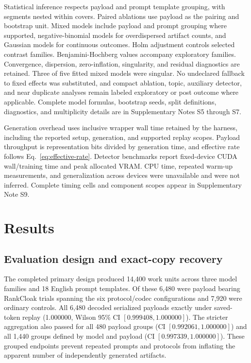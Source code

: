 \documentclass[fleqn,10pt]{wlscirep}
\begin{document}
Statistical inference respects payload and prompt template grouping, with segments nested within covers. Paired ablations use payload as the pairing and bootstrap unit. Mixed models include payload and prompt grouping where supported, negative-binomial models for overdispersed artifact counts, and Gaussian models for continuous outcomes\cite{Bates2015lme4,Brooks2017glmmTMB}. Holm adjustment controls selected contrast families. Benjamini-Hochberg values accompany exploratory families. Convergence, dispersion, zero-inflation, singularity, and residual diagnostics are retained. Three of five fitted mixed models were singular. No undeclared fallback to fixed effects was substituted, and compact ablation, topic, auxiliary detector, and near duplicate analyses remain labeled exploratory or post outcome where applicable. Complete model formulas, bootstrap seeds, split definitions, diagnostics, and multiplicity details are in Supplementary Notes S5 through S7.

Generation overhead uses inclusive wrapper wall time retained by the harness, including the reported setup, generation, and supported replay scopes. Payload throughput is representation bits divided by generation time, and effective rate follows Eq.~\eqref{eq:effective-rate}. Detector benchmarks report fixed-device CUDA wall/training time and peak allocated VRAM. CPU time, repeated warm-up measurements, and generalization across devices were unavailable and were not inferred. Complete timing cells and component scopes appear in Supplementary Note S9.







\section*{Results}\label{sec:results}

\subsection*{Evaluation design and exact-copy recovery}\label{sec:results-recovery}

The completed primary design produced 14,400 work units across three model families and 18 English prompt templates. Of these 6,480 were payload bearing RankCloak trials spanning the six protocol/codec configurations and 7,920 were ordinary controls. All 6,480 decoded serialized payloads exactly under saved-token replay (1.000000, Wilson 95\% CI \([0.999408, 1.000000]\)). The stricter aggregation also passed for all 480 payload groups (CI \([0.992061, 1.000000]\)) and all 1,440 groups defined by model and payload (CI \([0.997339, 1.000000]\)). These grouped endpoints prevent repeated prompts and protocols from inflating the apparent number of independently generated artifacts.
\end{document}
